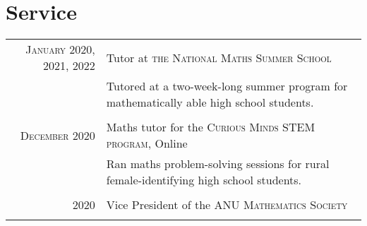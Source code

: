 \documentclass[a4paper,10pt]{article} %
\begin{document}
\section{Service}

\begin{tabular}{r|p{12cm}}

\textsc{January 2020, 2021, 2022} & Tutor at \textsc{the National Maths Summer School} \emph{}\\
& \footnotesize{Tutored at a two-week-long summer program for mathematically able high school students.}\\
\multicolumn{2}{c}{} \\


\textsc{December 2020} & Maths tutor for the \textsc{Curious Minds STEM program}, Online \emph{}\\
& \footnotesize{Ran maths problem-solving sessions for rural female-identifying high school students.}\\
\multicolumn{2}{c}{} \\


\textsc{2020} & Vice President of the \textsc{ANU Mathematics Society}\\
\multicolumn{2}{c}{} \\



\end{tabular}
\end{document}
